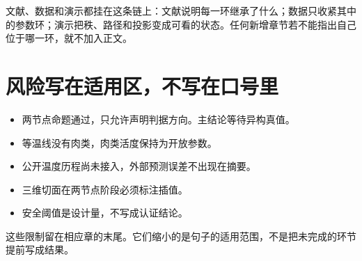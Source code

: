 文献、数据和演示都挂在这条链上：文献说明每一环继承了什么；数据只收紧其中的参数环；演示把秩、路径和投影变成可看的状态。任何新增章节若不能指出自己位于哪一环，就不加入正文。

\section{风险写在适用区，不写在口号里}

\begin{itemize}
\item 两节点命题通过，只允许声明判据方向。主结论等待异构真值。
\item 等温线没有肉类，肉类活度保持为开放参数。
\item 公开温度历程尚未接入，外部预测误差不出现在摘要。
\item 三维切面在两节点阶段必须标注插值。
\item 安全阈值是设计量，不写成认证结论。
\end{itemize}

这些限制留在相应章的末尾。它们缩小的是句子的适用范围，不是把未完成的环节提前写成结果。
